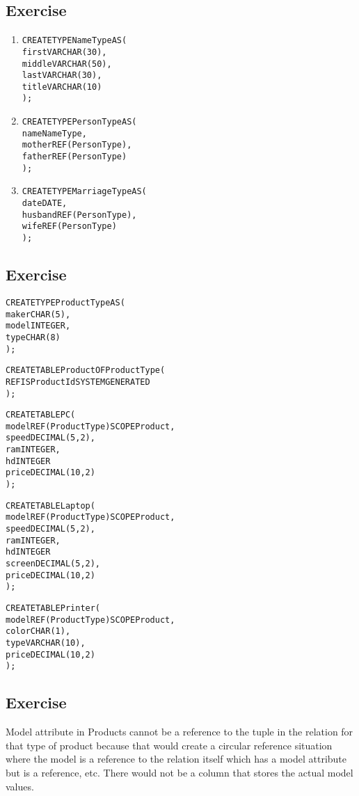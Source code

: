 \setcounter{subsection}{2}
\subsection*{Exercise \thesubsection}
\begin{enumerate}
\item
\begin{alltt}
CREATE TYPE NameType AS(
  first   VARCHAR(30),
  middle  VARCHAR(50),
  last    VARCHAR(30),
  title   VARCHAR(10)
 );
\end{alltt}
\item
\begin{alltt}
CREATE TYPE PersonType AS(
  name    NameType,
  mother  REF(PersonType),
  father  REF(PersonType)
);
\end{alltt}
\item
\begin{alltt}
CREATE TYPE MarriageType AS(
  date     DATE,
  husband  REF(PersonType),
  wife     REF(PersonType)
);
\end{alltt}
\end{enumerate}

\setcounter{subsection}{3}
\subsection*{Exercise \thesubsection}
\begin{alltt}
CREATE TYPE ProductType AS(
  maker       CHAR(5),
  model       INTEGER,
  type        CHAR(8)
);

CREATE TABLE Product OF ProductType(
  REF IS ProductId SYSTEM GENERATED
);

CREATE TABLE PC(
  model       REF(ProductType) SCOPE Product,
  speed       DECIMAL(5,2),
  ram         INTEGER,
  hd          INTEGER
  price       DECIMAL(10,2)
);

CREATE TABLE Laptop(
  model       REF(ProductType) SCOPE Product,
  speed       DECIMAL(5,2),
  ram         INTEGER,
  hd          INTEGER
  screen      DECIMAL(5,2),
  price       DECIMAL(10,2)
);

CREATE TABLE Printer(
  model       REF(ProductType) SCOPE Product,
  color       CHAR(1),
  type        VARCHAR(10),
  price       DECIMAL(10,2)
);
\end{alltt}

\setcounter{subsection}{4}
\subsection*{Exercise \thesubsection}
Model attribute in Products cannot be a reference to the tuple
in the relation for that type of product because that would create a
circular reference situation where the model is a reference to the
relation itself which has a model attribute but is a reference, etc.
There would not be a column that stores the actual model values.

